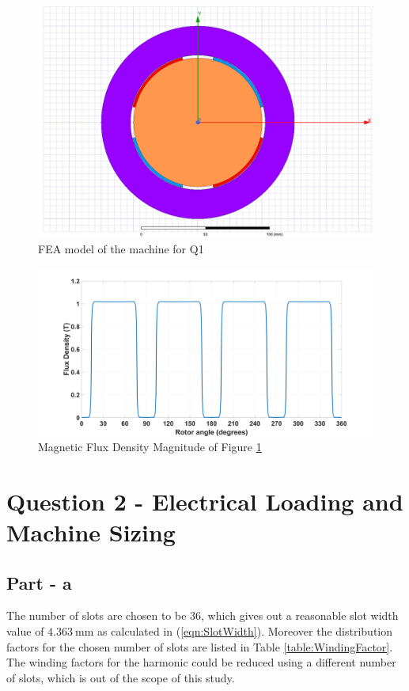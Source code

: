 \documentclass{article}
\begin{document}
\begin{figure}[h!]
\centering
\includegraphics[scale=0.5]{Figures/MachineQ1.png}
\caption{FEA model of the machine for Q1}
\label{fig:MachineQ1}
\end{figure}

\begin{figure}[h!]
\centering
\includegraphics[scale=0.15]{Figures/MagB.png}
\caption{Magnetic Flux Density Magnitude of Figure \ref{fig:MachineQ1}}
\label{fig:MagB}
\end{figure}

\section{Question 2 - Electrical Loading and Machine Sizing}
\subsection{Part - a}
The number of slots are chosen to be 36, which gives out a reasonable slot width value of $4.363 \: \mathrm{mm}$ as calculated in (\ref{eqn:SlotWidth}). Moreover the distribution factors for the chosen number of slots are listed in Table \ref{table:WindingFactor}. The winding factors for the harmonic could be reduced using a different number of slots, which is out of the scope of this study. 
\end{document}
